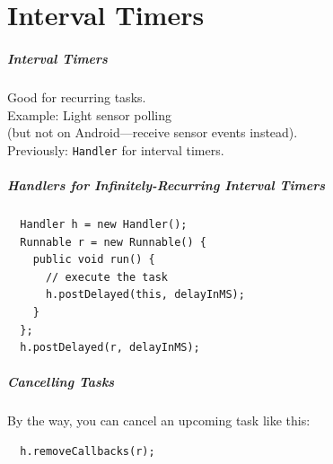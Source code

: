 \part{Interval Timers}
\frame{\partpage}

\begin{frame}
\frametitle{Interval Timers}

\begin{changemargin}{1cm}
\large

Good for recurring tasks.\\[1em]

Example: Light sensor polling\\
 (but not on Android---receive sensor events instead).\\[1em]

Previously: {\tt Handler} for interval timers.

\end{changemargin}

\end{frame}

\begin{frame}[fragile]
\frametitle{Handlers for Infinitely-Recurring Interval Timers}

\begin{lstlisting}
  Handler h = new Handler();
  Runnable r = new Runnable() {
    public void run() {
      // execute the task
      h.postDelayed(this, delayInMS);
    }
  };
  h.postDelayed(r, delayInMS);
\end{lstlisting}

\end{frame}

\begin{frame}[fragile]
\frametitle{Cancelling Tasks}

\begin{changemargin}{1cm}
By the way, you can cancel an upcoming task like this:
\begin{lstlisting}
  h.removeCallbacks(r);
\end{lstlisting}
\end{changemargin}
\end{frame}

